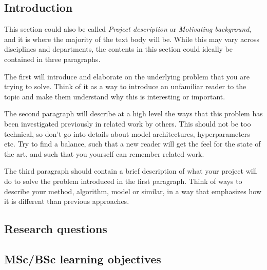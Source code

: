 \documentclass{article}
\begin{document}
\subsection{Introduction}
This section could also be called \emph{Project description} or \emph{Motivating background}, and it is where the majority of the text body will be.
While this may vary across disciplines and departments, the contents in this section could ideally be contained in three paragraphs.

The first will introduce and elaborate on the underlying problem that you are trying to solve.
Think of it as a way to introduce an unfamiliar reader to the topic and make them understand why this is interesting or important.

The second paragraph will describe at a high level the ways that this problem has been investigated previously in related work by others.
This should not be too technical, so don't go into details about model architectures, hyperparameters etc. 
Try to find a balance, such that a new reader will get the feel for the state of the art, and such that you yourself can remember related work.

The third paragraph should contain a brief description of what your project will do to solve the problem introduced in the first paragraph.
Think of ways to describe your method, algorithm, model or similar, in a way that emphasizes how it is different than previous approaches.


\subsection{Research questions}

\subsection{MSc/BSc learning objectives}
\end{document}
